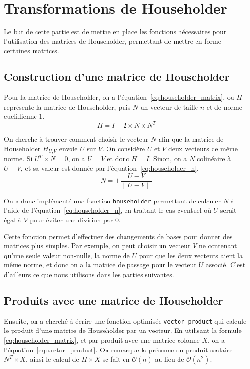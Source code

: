 \section{Transformations de Householder}
Le but de cette partie est de mettre en place les fonctions nécessaires pour l'utilisation des
matrices de Householder, permettant de mettre en forme certaines matrices.

\subsection{Construction d'une matrice de Householder}

Pour la matrice de Householder, on a l'équation~\ref{eq:householder_matrix},
où $H$ représente la matrice de Householder, puis $N$ un vecteur de taille $n$ et de norme euclidienne $1$.
\begin{equation}
	H = I - 2 \times N \times N^T
	\label{eq:householder_matrix}
\end{equation}

On cherche à trouver comment choisir le vecteur $N$ afin que la matrice de Householder
$H_{U,V}$ envoie $U$ sur $V$. On considère $U$ et $V$ deux vecteurs de même norme.
Si $U^T \times N = 0$, on a $U = V$ et donc $H = I$.
Sinon, on a $N$ colinéaire à $U - V$, et sa valeur est donnée par l'équation~\ref{eq:householder_n}.
\begin{equation}
	N=\pm \frac{U-V}{\|U-V\|}
	\label{eq:householder_n}
\end{equation}

On a donc implémenté une fonction \verb|householder| permettant de calculer $N$ à l'aide de l'équation~\ref{eq:householder_n}, en traitant le cas éventuel où $U$ serait égal à $V$
pour éviter une division par $0$.

Cette fonction permet d'effectuer des changements de bases pour donner des matrices plus simples.
Par exemple, on peut choisir un vecteur $V$ ne contenant qu'une seule valeur non-nulle, la norme de $U$ pour que les deux vecteurs aient la même norme, 
et donc on a la matrice de passage pour le vecteur $U$ associé. C'est d'ailleurs ce que nous utilisons dans les parties suivantes.

\subsection{Produits avec une matrice de Householder}

Ensuite, on a cherché à écrire une fonction optimisée \verb|vector_product| qui calcule le produit d'une matrice de Householder par un vecteur.
En utilisant la formule \ref{eq:householder_matrix}, et par produit avec une matrice colonne $X$, on a l'équation~\ref{eq:vector_product}.
On remarque la présence du produit scalaire $N^T \times X$, ainsi le calcul de $H \times X$ se fait en $\mathcal{O}(n)$ au lieu de $\mathcal{O}(n^2)$.


